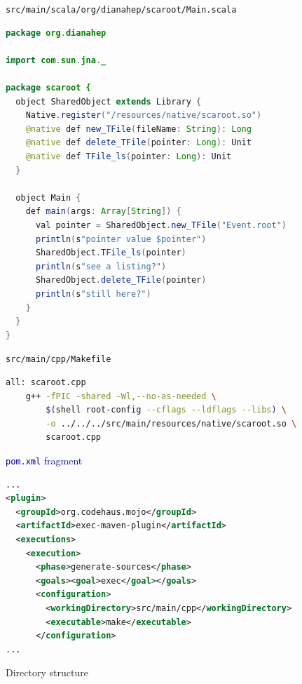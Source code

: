 \documentclass{beamer}
\begin{document}
\begin{frame}[fragile]{\tt src/main/scala/org/dianahep/scaroot/Main.scala}
\begin{lstlisting}[language=java]
package org.dianahep

import com.sun.jna._

package scaroot {
  object SharedObject extends Library {
    Native.register("/resources/native/scaroot.so")
    @native def new_TFile(fileName: String): Long
    @native def delete_TFile(pointer: Long): Unit
    @native def TFile_ls(pointer: Long): Unit
  }

  object Main {
    def main(args: Array[String]) {
      val pointer = SharedObject.new_TFile("Event.root")
      println(s"pointer value $pointer")
      SharedObject.TFile_ls(pointer)
      println(s"see a listing?")
      SharedObject.delete_TFile(pointer)
      println(s"still here?")
    }
  }
}
\end{lstlisting}
\end{frame}

\begin{frame}[fragile]{\tt src/main/cpp/Makefile}
\small
\begin{lstlisting}[language=sh]
all: scaroot.cpp
    g++ -fPIC -shared -Wl,--no-as-needed \
        $(shell root-config --cflags --ldflags --libs) \
        -o ../../../src/main/resources/native/scaroot.so \
        scaroot.cpp
\end{lstlisting}

\vfill
\hspace{-0.83 cm} \textcolor{darkblue}{\Large {\tt pom.xml} fragment}
\begin{lstlisting}[language=XML]
...
<plugin>
  <groupId>org.codehaus.mojo</groupId>
  <artifactId>exec-maven-plugin</artifactId>
  <executions>
    <execution>
      <phase>generate-sources</phase>
      <goals><goal>exec</goal></goals>
      <configuration>
        <workingDirectory>src/main/cpp</workingDirectory>
        <executable>make</executable>
      </configuration>
...
\end{lstlisting}
\end{frame}

\begin{frame}[fragile]{Directory structure}
\small
{}
\end{frame}
\end{document}

